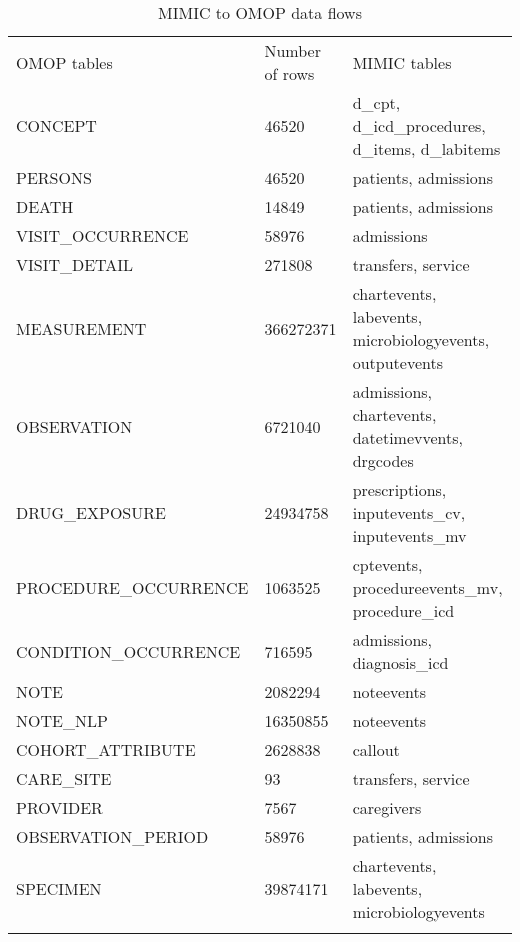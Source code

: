 \begin{table*}[t]
\caption{MIMIC to OMOP data flows}
\begin{tabular}{@{}lll@{}}\toprule
OMOP tables           & Number of rows & MIMIC tables                                             \\\colrule
CONCEPT               & 46520          & d\_cpt, d\_icd\_procedures, d\_items, d\_labitems        \\
PERSONS               & 46520          & patients, admissions                                     \\
DEATH                 & 14849          & patients, admissions                                     \\
VISIT\_OCCURRENCE     & 58976          & admissions                                               \\
VISIT\_DETAIL         & 271808         & transfers, service                                       \\
MEASUREMENT           & 366272371      & chartevents, labevents, microbiologyevents, outputevents \\
OBSERVATION           & 6721040        & admissions, chartevents, datetimevvents, drgcodes        \\
DRUG\_EXPOSURE        & 24934758       & prescriptions, inputevents\_cv, inputevents\_mv          \\
PROCEDURE\_OCCURRENCE & 1063525        & cptevents, procedureevents\_mv, procedure\_icd           \\
CONDITION\_OCCURRENCE & 716595         & admissions, diagnosis\_icd                               \\
NOTE                  & 2082294        & noteevents                                               \\
NOTE\_NLP             & 16350855       & noteevents                                               \\
COHORT\_ATTRIBUTE     & 2628838        & callout                                                  \\
CARE\_SITE            & 93             & transfers, service                                       \\
PROVIDER              & 7567           & caregivers                                               \\
OBSERVATION\_PERIOD   & 58976          & patients, admissions                                     \\
SPECIMEN              & 39874171       & chartevents, labevents, microbiologyevents               \\\botrule
\end{tabular}
\label{table:dispatch}
\end{table*}
 

